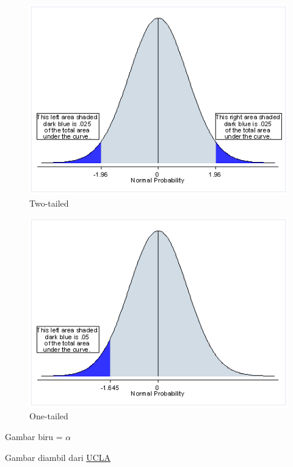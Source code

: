 \documentclass[
  letterpaper,
  DIV=11,
  numbers=noendperiod]{scrartcl}
\begin{document}
\begin{figure}[H]

{\centering \includegraphics{pvalue1.gif}

}

\caption{Two-tailed}

\end{figure}%
\begin{figure}[H]

{\centering \includegraphics{pvalue2.gif}

}

\caption{One-tailed}

\end{figure}%

Gambar biru = \(\alpha\)

Gambar diambil dari
\href{https://stats.oarc.ucla.edu/other/mult-pkg/faq/general/faq-what-are-the-differences-between-one-tailed-and-two-tailed-tests/}{UCLA}
\end{document}
